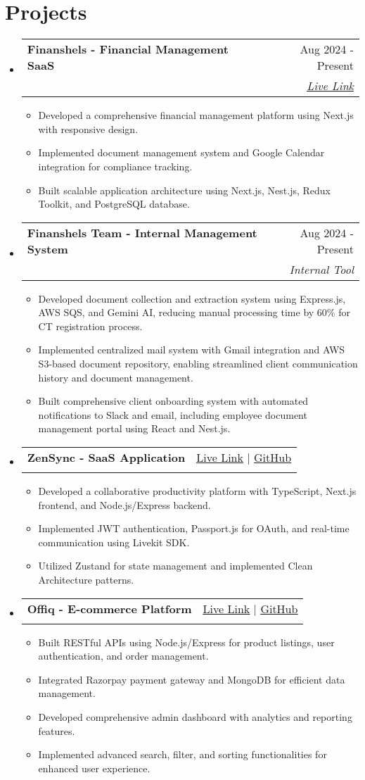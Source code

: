 \documentclass[letterpaper,11pt]{article}
\makeatletter
\newcommand{\resumeItem}[1]{\item\small{#1}}
\newcommand{\resumeSubheading}[4]{
  \vspace{-2pt}\item
    \begin{tabular*}{0.97\textwidth}[t]{l@{\extracolsep{\fill}}r}
      \textbf{#1} & #2 \\
      \textit{\small#3} & \textit{\small #4} \\
    \end{tabular*}\vspace{-8pt}
}
\newcommand{\resumeSubHeadingListStart}{\begin{itemize}[leftmargin=0.15in, label={}]}
\newcommand{\resumeSubHeadingListEnd}{\end{itemize}\vspace{-6pt}}
\newcommand{\resumeItemListStart}{\begin{itemize}}
\newcommand{\resumeItemListEnd}{\end{itemize}\vspace{-6pt}}
\makeatother
\begin{document}
\section{Projects}
\resumeSubHeadingListStart
\resumeSubheading
{\textbf{Finanshels} - Financial Management SaaS}{Aug 2024 - Present}
{}{\color{blue}\underline{\href{https://www.finanshels.com/finanshels-app}{Live Link}}}
\resumeItemListStart
\resumeItem{Developed a comprehensive financial management platform using Next.js with responsive design.}
\resumeItem{Implemented document management system and Google Calendar integration for compliance tracking.}
\resumeItem{Built scalable application architecture using Next.js, Nest.js, Redux Toolkit, and PostgreSQL database.}
\resumeItemListEnd
\resumeSubheading
{\textbf{Finanshels Team} - Internal Management System}{Aug 2024 - Present}
{}{Internal Tool}
\resumeItemListStart
\resumeItem{Developed document collection and extraction system using Express.js, AWS SQS, and Gemini AI, reducing manual processing time by 60\% for CT registration process.}
\resumeItem{Implemented centralized mail system with Gmail integration and AWS S3-based document repository, enabling streamlined client communication history and document management.}
\resumeItem{Built comprehensive client onboarding system with automated notifications to Slack and email, including employee document management portal using React and Nest.js.}
\resumeItemListEnd
\resumeSubheading
{\textbf{ZenSync} - SaaS Application}{\color{blue}\underline{\href{https://www.zensync.ltd/}{Live Link}} \color{black} $|$ \color{blue}\underline{\href{https://github.com/dreamographer/zenSync-backend}{GitHub}}}
{}{}
\resumeItemListStart
\resumeItem{Developed a collaborative productivity platform with TypeScript, Next.js frontend, and Node.js/Express backend.}
\resumeItem{Implemented JWT authentication, Passport.js for OAuth, and real-time communication using Livekit SDK.}
\resumeItem{Utilized Zustand for state management and implemented Clean Architecture patterns.}
\resumeItemListEnd
\resumeSubheading
{\textbf{Offiq} - E-commerce Platform}{\color{blue}\underline{\href{https://offiq-shop.onrender.com}{Live Link}} \color{black} $|$ \color{blue}\underline{\href{https://github.com/dreamographer/OFFIQ}{GitHub}}}
{}{}
\resumeItemListStart
\resumeItem{Built RESTful APIs using Node.js/Express for product listings, user authentication, and order management.}
\resumeItem{Integrated Razorpay payment gateway and MongoDB for efficient data management.}
\resumeItem{Developed comprehensive admin dashboard with analytics and reporting features.}
\resumeItem{Implemented advanced search, filter, and sorting functionalities for enhanced user experience.}
\resumeItemListEnd
\resumeSubHeadingListEnd
\end{document}
